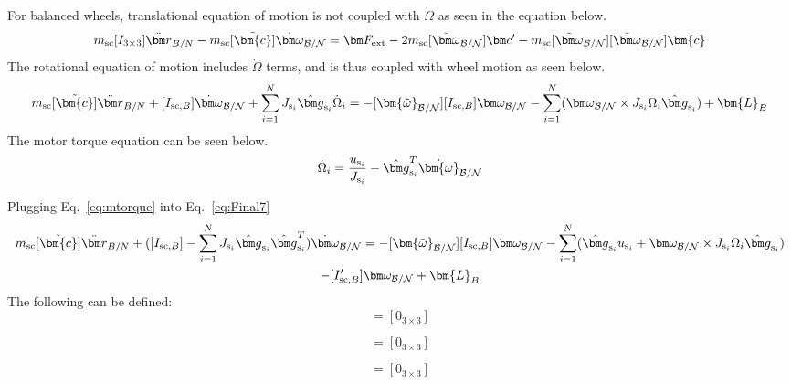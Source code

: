 For balanced wheels, translational equation of motion is not coupled with $\dot{\Omega}$ as seen in the equation below.
\begin{equation}
m_{\text{sc}} [I_{3 \times 3}]\ddot{\bm r}_{B/N}
-m_{\text{sc}} [\tilde{\bm{c}}] \dot{\bm\omega}_{\cal B/N}
= \bm F_{\text{ext}}- 2 m_{\text{sc}} [\tilde{\bm\omega}_{\cal B/N}] \bm c'
-m_{\text{sc}} [\tilde{\bm\omega}_{\cal B/N}][\tilde{\bm\omega}_{\cal B/N}]\bm{c}
\label{eq:Rbddot35}
\end{equation}
The rotational equation of motion includes $\dot{\Omega}$ terms, and is thus coupled with wheel motion as seen below.
\begin{multline}
m_{\text{sc}}[\tilde{\bm{c}}] \ddot{\bm r}_{B/N}
+[I_{\text{sc},B}] \dot{\bm\omega}_{\cal B/N}
+\sum_{i=1}^{N}J_{\text{s}_i} \hat{\bm g}_{\text{s}_i}\dot{\Omega}_i
= -[\bm{\tilde{\omega}}_{\cal B/N}] [I_{\text{sc},B}] \bm\omega_{\cal B/N} - \sum_{i=1}^{N}(\bm\omega_{\cal B/N}\times J_{\text{s}_i}\Omega_i\hat{\bm g}_{\text{s}_i})
+ \bm{L}_B
\label{eq:Final7}
\end{multline}
The motor torque equation can be seen below.
\begin{equation}
\dot{\Omega}_i = \frac{u_{\text{s}_i}}{J_{\text{s}_i}}-\hat{\bm g}_{\text{s}_i}^T \dot{\bm{\omega}}_{\cal B/N}
\label{eq:mtorque}
\end{equation}

Plugging Eq.~\eqref{eq:mtorque} into Eq.~\eqref{eq:Final7}
\begin{multline}
m_{\text{sc}}[\tilde{\bm{c}}] \ddot{\bm r}_{B/N}
+([I_{\text{sc},B}]-\sum_{i=1}^{N}J_{\text{s}_i} \hat{\bm g}_{\text{s}_i} \hat{\bm g}_{\text{s}_i}^T) \dot{\bm\omega}_{\cal B/N}
= -[\bm{\tilde{\omega}}_{\cal B/N}] [I_{\text{sc},B}] \bm\omega_{\cal B/N} - \sum_{i=1}^{N}(\hat{\bm g}_{\text{s}_i} u_{\text{s}_i} + \bm\omega_{\cal B/N}\times J_{\text{s}_i}\Omega_i\hat{\bm g}_{\text{s}_i})
\\- [I'_{\text{sc},B}] \bm\omega_{\cal B/N}
+ \bm{L}_B
\label{eq:Final72}
\end{multline}
The following can be defined:
\begin{equation}
[A_\text{contr}] = [0_{3 \times 3}]
\end{equation}

\begin{equation}
[B_\text{contr}] = [0_{3 \times 3}]
\end{equation}

\begin{equation}
[C_\text{contr}] = [0_{3 \times 3}]
\end{equation}

